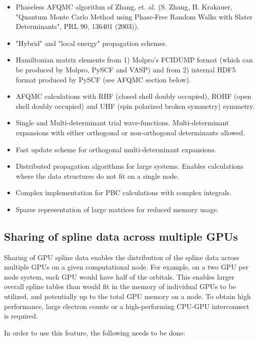 \begin{itemize}
    \item Phaseless AFQMC algorithm of Zhang, et. al. (S. Zhang, H. Krakauer, "Quantum Monte Carlo Method using Phase-Free Random Walks with Slater Determinants", PRL 90, 136401 (2003)).
    \item "Hybrid" and "local energy" propagation schemes.
    \item Hamiltonian matrix elements from 1) Molpro's FCIDUMP format (which can be produced by Molpro, PySCF and VASP) and from 2) internal HDF5 format produced by PySCF (see AFQMC section below).
    \item AFQMC calculations with RHF (closed shell doubly occupied), ROHF (open shell doubly occupied) and UHF (spin polarized broken symmetry) symmetry. 
    \item Single and Multi-determinant trial wave-functions. Multi-determinant expansions with either orthogonal or non-orthogonal determinants allowed. 
    \item Fast update scheme for orthogonal multi-determinant expansions.
    \item Distributed propagation algorithms for large systems. Enables calculations where the data structures do not fit on a single node.
    \item Complex implementation for PBC calculations with complex integrals.
    \item Sparse representation of large matrices for reduced memory usage.
\end{itemize}

\subsection{Sharing of spline data across multiple GPUs}

Sharing of GPU spline data enables the distribution of the spline data
across multiple GPUs on a given computational node. For example, on a
two GPU per node system, each GPU would have half of the
orbitals. This enables larger overall spline tables than would fit in
the memory of individual GPUs to be utilized, and potentially up to
the total GPU memory on a node. To obtain high performance, large
electron counts or a high-performing CPU-GPU interconnect is required.

In order to use this feature, the following needs to be done:

